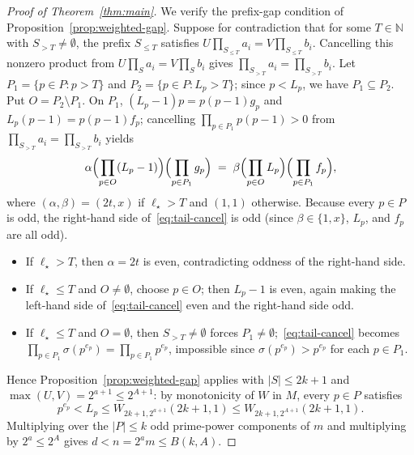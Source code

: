 \documentclass[11pt]{amsart}
\theoremstyle{definition}
\theoremstyle{remark}
\begin{document}
\begin{proof}[Proof of Theorem~\ref{thm:main}]
We verify the prefix-gap condition of Proposition~\ref{prop:weighted-gap}. Suppose for contradiction that for some $T \in \mathbb{N}$ with $S_{>T} \ne \emptyset$, the prefix $S_{\le T}$ satisfies $U \prod_{S_{\le T}} a_i = V \prod_{S_{\le T}} b_i$. Cancelling this nonzero product from $U \prod_S a_i = V \prod_S b_i$ gives $\prod_{S_{>T}} a_i = \prod_{S_{>T}} b_i$. Let $P_1 = \{p \in P : p > T\}$ and $P_2 = \{p \in P : L_p > T\}$; since $p < L_p$, we have $P_1 \subseteq P_2$. Put $O = P_2 \setminus P_1$. On $P_1$, $(L_p - 1) p = p(p - 1) g_p$ and $L_p(p - 1) = p(p - 1) f_p$; cancelling $\prod_{p \in P_1} p(p - 1) > 0$ from $\prod_{S_{>T}} a_i = \prod_{S_{>T}} b_i$ yields
\begin{equation}\label{eq:tail-cancel}
  \alpha \Bigl(\prod_{p \in O} (L_p - 1)\Bigr) \Bigl(\prod_{p \in P_1} g_p\Bigr) \;=\; \beta \Bigl(\prod_{p \in O} L_p\Bigr) \Bigl(\prod_{p \in P_1} f_p\Bigr),
\end{equation}
where $(\alpha, \beta) = (2t, x)$ if $\ell_\star > T$ and $(1, 1)$ otherwise. Because every $p \in P$ is odd, the right-hand side of~\eqref{eq:tail-cancel} is odd (since $\beta \in \{1, x\}$, $L_p$, and $f_p$ are all odd).
\begin{itemize}
  \item If $\ell_\star > T$, then $\alpha = 2t$ is even, contradicting oddness of the right-hand side.
  \item If $\ell_\star \le T$ and $O \ne \emptyset$, choose $p \in O$; then $L_p - 1$ is even, again making the left-hand side of~\eqref{eq:tail-cancel} even and the right-hand side odd.
  \item If $\ell_\star \le T$ and $O = \emptyset$, then $S_{>T} \ne \emptyset$ forces $P_1 \ne \emptyset$;~\eqref{eq:tail-cancel} becomes $\prod_{p \in P_1} \sigma(p^{e_p}) = \prod_{p \in P_1} p^{e_p}$, impossible since $\sigma(p^{e_p}) > p^{e_p}$ for each $p \in P_1$.
\end{itemize}

Hence Proposition~\ref{prop:weighted-gap} applies with $|S| \le 2k + 1$ and $\max(U, V) = 2^{a+1} \le 2^{A+1}$: by monotonicity of $W$ in $M$, every $p \in P$ satisfies
\[
  p^{e_p} < L_p \le W_{2k+1, 2^{a+1}}(2k + 1, 1) \le W_{2k+1, 2^{A+1}}(2k + 1, 1).
\]
Multiplying over the $|P| \le k$ odd prime-power components of $m$ and multiplying by $2^a \le 2^A$ gives $d < n = 2^a m \le B(k, A)$.
\end{proof}
\end{document}
